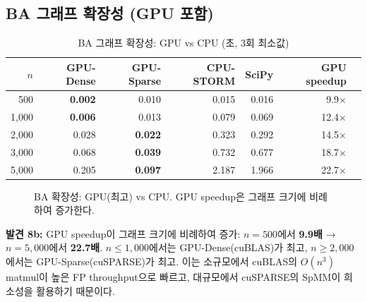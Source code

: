 \documentclass[11pt,a4paper]{article}
\begin{document}
\subsection{BA 그래프 확장성 (GPU 포함)}

\begin{table}[ht]\centering
\caption{BA 그래프 확장성: GPU vs CPU (초, 3회 최소값)}
\begin{tabular}{@{}rrrrrrr@{}}
\toprule
$n$ & \textbf{GPU-Dense} & \textbf{GPU-Sparse} & \textbf{CPU-STORM} & \textbf{SciPy} & \textbf{GPU speedup} \\
\midrule
500 & \textbf{0.002} & 0.010 & 0.015 & 0.016 & 9.9$\times$ \\
1,000 & \textbf{0.006} & 0.013 & 0.079 & 0.069 & 12.4$\times$ \\
2,000 & 0.028 & \textbf{0.022} & 0.323 & 0.292 & 14.5$\times$ \\
3,000 & 0.068 & \textbf{0.039} & 0.732 & 0.677 & 18.7$\times$ \\
5,000 & 0.205 & \textbf{0.097} & 2.187 & 1.966 & 22.7$\times$ \\
\bottomrule
\end{tabular}
\end{table}

\begin{figure}[ht]
\centering
{}
\caption{BA 확장성: GPU(최고) vs CPU. GPU speedup은 그래프 크기에 비례하여 증가한다.}
\label{fig:ba-gpu}
\end{figure}

\textbf{발견 8b:} GPU speedup이 그래프 크기에 비례하여 증가: $n\!=\!500$에서 \textbf{9.9배} → $n\!=\!5{,}000$에서 \textbf{22.7배}. $n \leq 1{,}000$에서는 GPU-Dense(cuBLAS)가 최고, $n \geq 2{,}000$에서는 GPU-Sparse(cuSPARSE)가 최고. 이는 소규모에서 cuBLAS의 $O(n^3)$ matmul이 높은 FP throughput으로 빠르고, 대규모에서 cuSPARSE의 SpMM이 희소성을 활용하기 때문이다.
\end{document}
